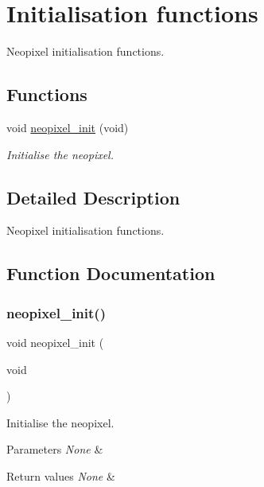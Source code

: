 \hypertarget{group___neo_pixel___init}{}\section{Initialisation functions}
\label{group___neo_pixel___init}


Neopixel initialisation functions.  


\subsection*{Functions}
\begin{DoxyCompactItemize}
\item 
void \hyperlink{group___neo_pixel___init_gaac78468985e44a3e4d353ea9276b33bc}{neopixel\+\_\+init} (void)
\begin{DoxyCompactList}\small\item\em Initialise the neopixel. \end{DoxyCompactList}\end{DoxyCompactItemize}


\subsection{Detailed Description}
Neopixel initialisation functions. 



\subsection{Function Documentation}
\mbox{\label{group___neo_pixel___init_gaac78468985e44a3e4d353ea9276b33bc}} 
\subsubsection{\texorpdfstring{neopixel\+\_\+init()}{neopixel\_init()}}
{\footnotesize\ttfamily void neopixel\+\_\+init (\begin{DoxyParamCaption}\item[{void}]{ }\end{DoxyParamCaption})}



Initialise the neopixel. 


\begin{DoxyParams}{Parameters}
{\em None} & \\
\hline
\end{DoxyParams}

\begin{DoxyRetVals}{Return values}
{\em None} & \\
\hline
\end{DoxyRetVals}

